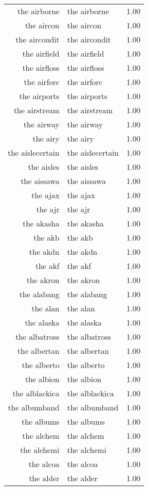 \begin{table}[ht]
\begin{tabular}{rlr}
  the airborne & the airborne & 1.00 \\ 
  the aircon & the aircon & 1.00 \\ 
  the aircondit & the aircondit & 1.00 \\ 
  the airfield & the airfield & 1.00 \\ 
  the airfloss & the airfloss & 1.00 \\ 
  the airforc & the airforc & 1.00 \\ 
  the airports & the airports & 1.00 \\ 
  the airstream & the airstream & 1.00 \\ 
  the airway & the airway & 1.00 \\ 
  the airy & the airy & 1.00 \\ 
  the aislecertain & the aislecertain & 1.00 \\ 
  the aisles & the aisles & 1.00 \\ 
  the aissawa & the aissawa & 1.00 \\ 
  the ajax & the ajax & 1.00 \\ 
  the ajr & the ajr & 1.00 \\ 
  the akasha & the akasha & 1.00 \\ 
  the akb & the akb & 1.00 \\ 
  the akdn & the akdn & 1.00 \\ 
  the akf & the akf & 1.00 \\ 
  the akron & the akron & 1.00 \\ 
  the alabang & the alabang & 1.00 \\ 
  the alan & the alan & 1.00 \\ 
  the alaska & the alaska & 1.00 \\ 
  the albatross & the albatross & 1.00 \\ 
  the albertan & the albertan & 1.00 \\ 
  the alberto & the alberto & 1.00 \\ 
  the albion & the albion & 1.00 \\ 
  the alblackica & the alblackica & 1.00 \\ 
  the albumband & the albumband & 1.00 \\ 
  the albums & the albums & 1.00 \\ 
  the alchem & the alchem & 1.00 \\ 
  the alchemi & the alchemi & 1.00 \\ 
  the alcoa & the alcoa & 1.00 \\ 
  the alder & the alder & 1.00 \\ 

\end{tabular}
\end{table}
